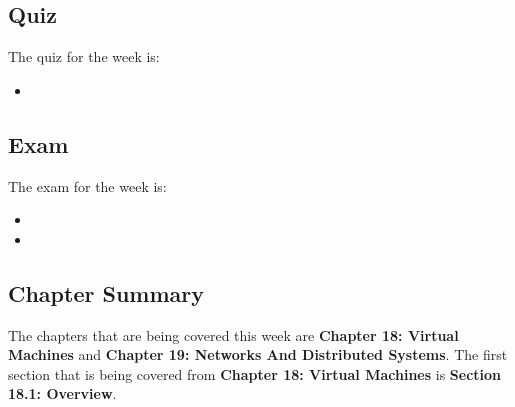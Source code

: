 \subsection{Quiz}

The quiz for the week is:

\begin{itemize}
    \item {}
\end{itemize}

\subsection{Exam}

The exam for the week is:

\begin{itemize}
    \item {}
    \item {}
\end{itemize}

\newpage

\subsection{Chapter Summary}

The chapters that are being covered this week are \textbf{Chapter 18: Virtual Machines} and \textbf{Chapter 19: Networks And Distributed Systems}. The first section that is being covered from 
\textbf{Chapter 18: Virtual Machines} is \textbf{Section 18.1: Overview}.


